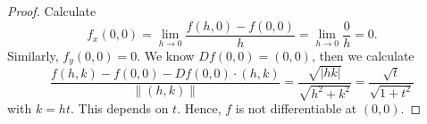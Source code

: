 \begin{Exercise}
\begin{proof}
Calculate
$$
f_x(0,0) 
= \lim_{h\to 0} \frac{f(h,0)-f(0,0)}{h} 
= \lim_{h\to 0} \frac{0}{h}
= 0.
$$
Similarly, $f_y(0,0) = 0$. We know $D f(0,0) = (0,0)$, then we calculate
$$
\frac{f(h,k)-f(0,0)-D f(0,0)\cdot(h,k)}{\| (h,k) \|}
= \frac{\sqrt{|h k|}}{\sqrt{h^2+k^2}}
= \frac{\sqrt{t}}{\sqrt{1+t^2}}
$$
with $k=h t$. This depends on $t$. Hence, $f$ is not differentiable at $(0,0)$. 
\end{proof}
\end{Exercise}